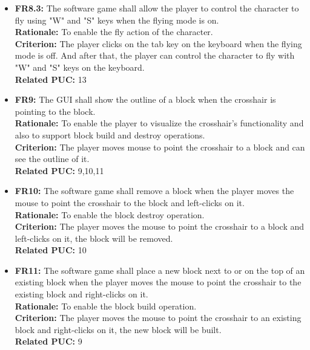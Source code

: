 \documentclass[12pt, titlepage]{article}
\begin{document}
\begin{itemize}
        \item \textbf{FR8.3:} The software game shall allow the player to control the character to fly using "W" and "S" keys when the flying mode is on.\\
        \textbf{Rationale:} To enable the fly action of the character.\\
        \textbf{Criterion:} The player clicks on the tab key on the keyboard when the flying mode is off. And after that, the player can control the character to fly with "W" and "S" keys on the keyboard.\\
        \textbf{Related PUC:} 13
        
        
        \item \textbf{FR9:} The GUI shall show the outline of a block when the crosshair is pointing to the block.\\
        \textbf{Rationale:} To enable the player to visualize the crosshair's functionality and also to support block build and destroy operations.\\
        \textbf{Criterion:} The player moves mouse to point the crosshair to a block and can see the outline of it.\\
        \textbf{Related PUC:} 9,10,11
        
        \item \textbf{FR10:} The software game shall remove a block when the player moves the mouse to point the crosshair to the block and left-clicks on it.\\
        \textbf{Rationale:} To enable the block destroy operation.\\
        \textbf{Criterion:} The player moves the mouse to point the crosshair to a block and left-clicks on it, the block will be removed.\\
        \textbf{Related PUC:} 10
        
        \item \textbf{FR11:} The software game shall place a new block next to or on the top of an existing block when the player moves the mouse to point the crosshair to the existing block and right-clicks on it.\\
        \textbf{Rationale:} To enable the block build operation.\\
        \textbf{Criterion:} The player moves the mouse to point the crosshair to an existing block and right-clicks on it, the new block will be built.\\
        \textbf{Related PUC:} 9
        

\end{itemize}
\end{document}
